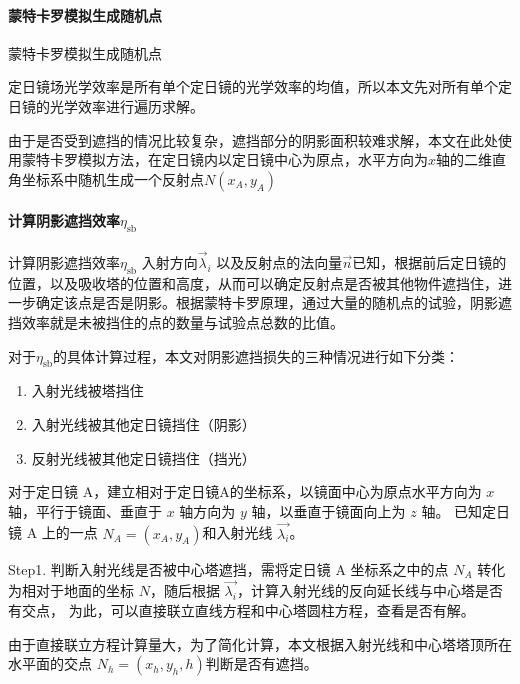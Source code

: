 \documentclass[../main.tex]{subfiles}
\begin{document}
\paragraph{蒙特卡罗模拟生成随机点}
蒙特卡罗模拟生成随机点

定日镜场光学效率是所有单个定日镜的光学效率的均值，所以本文先对所有单个定日镜的光学效率进行遍历求解。

由于是否受到遮挡的情况比较复杂，遮挡部分的阴影面积较难求解，本文在此处使用蒙特卡罗模拟方法，在定日镜内以定日镜中心为原点，水平方向为\(x\)轴的二维直角坐标系中随机生成一个反射点\(N(x_A,y_A)\)

\paragraph{计算阴影遮挡效率\(\eta_{\mathrm{s b}}\)}
计算阴影遮挡效率\(\eta_{\mathrm{s b}}\)
入射方向\(\vec \lambda _{i}\) 以及反射点的法向量\(\vec n\)已知，根据前后定日镜的位置，以及吸收塔的位置和高度，从而可以确定反射点是否被其他物件遮挡住，进一步确定该点是否是阴影。根据蒙特卡罗原理，通过大量的随机点的试验，阴影遮挡效率就是未被挡住的点的数量与试验点总数的比值。

对于\(\eta _{\mathrm{s b}}\)的具体计算过程，本文对阴影遮挡损失的三种情况进行如下分类：
\begin{enumerate}
\item 入射光线被塔挡住
\item 入射光线被其他定日镜挡住（阴影）
\item 反射光线被其他定日镜挡住（挡光）
\end{enumerate}
对于定日镜 A，建立相对于定日镜A的坐标系，以镜面中心为原点水平方向为 \(x\) 轴，平行于镜面、垂直于 \(x\) 轴方向为 \(y\) 轴，以垂直于镜面向上为 \(z\) 轴。
已知定日镜 A 上的一点 \(N_{A} = (x_{A}, y_{A})\)和入射光线 \(\vec {\lambda _{i}}\)。

Step1. 判断入射光线是否被中心塔遮挡，需将定日镜 A 坐标系之中的点 \(N_{A}\) 转化为相对于地面的坐标 \(N\)，随后根据 \(\vec {\lambda _{i}}\)，计算入射光线的反向延长线与中心塔是否有交点，
为此，可以直接联立直线方程和中心塔圆柱方程，查看是否有解。

由于直接联立方程计算量大，为了简化计算，本文根据入射光线和中心塔塔顶所在水平面的交点 \(N_{h} = (x _{h} , y_{h}, h)\)判断是否有遮挡。
\end{document}
